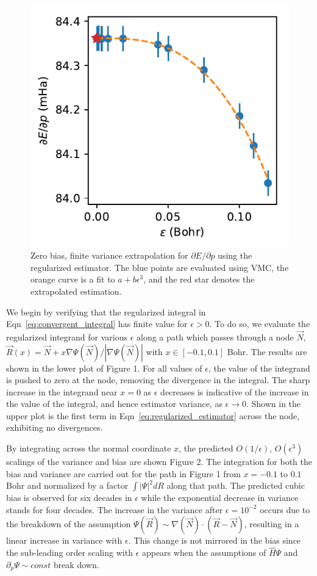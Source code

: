 \documentclass[twocolumn]{revtex4-1}
\begin{document}
\begin{figure}
\includegraphics{../2_plots/dedp.pdf}
\caption{Zero bias, finite variance extrapolation for $\partial E/\partial p$ using the regularized estimator. The blue points are evaluated using VMC, the orange curve is a fit to $a + b\epsilon^3$, and the red star denotes the extrapolated estimation. }
\end{figure}

We begin by verifying that the regularized integral in Eqn~\ref{eq:convergent_integral} has finite value for $\epsilon > 0$. 
To do so, we evaluate the regularized integrand for various $\epsilon$ along a path which passes through a node $\vec{N}$, $\vec{R}(x) = \vec{N} + x \nabla \Psi(\vec{N})/|\nabla \Psi(\vec{N})|$ with $x \in [-0.1, 0.1]$ Bohr.
The results are shown in the lower plot of Figure 1.
For all values of $\epsilon$, the value of the integrand is pushed to zero at the node, removing the divergence in the integral.
The sharp increase in the integrand near $x=0$ as $\epsilon$ decreases is indicative of the increase in the value of the integral, and hence estimator variance, as $\epsilon \rightarrow 0$.
Shown in the upper plot is the first term in Eqn~\ref{eq:regularized_estimator} across the node, exhibiting no divergences.

By integrating across the normal coordinate $x$, the predicted $O(1/\epsilon)$, $O(\epsilon^3)$ scalings of the variance and bias are shown Figure 2.
The integration for both the bias and variance are carried out for the path in Figure 1 from $x = -0.1$ to $0.1$ Bohr and normalized by a factor $\int |\Psi|^2 dR$ along that path.
The predicted cubic bias is observed for six decades in $\epsilon$ while the exponential decrease in variance stands for four decades.
The increase in the variance after $\epsilon = 10^{-2}$ occurs due to the breakdown of the assumption $\Psi(\vec{R}) \sim \nabla(\vec{N}) \cdot (\vec{R}-\vec{N})$, resulting in a linear increase in variance with $\epsilon$.
This change is not mirrored in the bias since the sub-leading order scaling with $\epsilon$ appears when the assumptions of $\hat{H}\Psi$ and $\partial_p \Psi \sim const$ break down.
\end{document}
